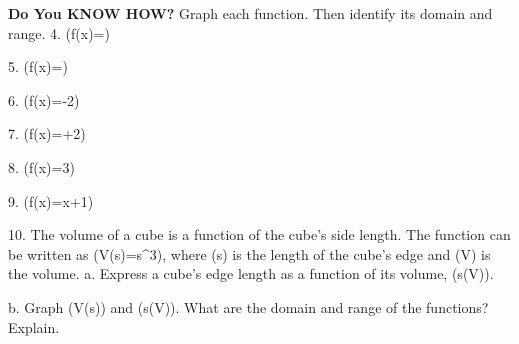 \documentclass{article}
\newenvironment{concept-summary}{}{}    %
\newcommand{\answer}[1]{}               %
\newcommand{\placeholder}[2]{}          %
\newcommand{\te}[1]{}                   %
\begin{document}
\begin{concept-summary}
\textbf{Do You KNOW HOW?}
Graph each function. Then identify its domain and range.
4. (f(x)=)
\answer{domain: (x\geq2); range: (y\geq0)}
\placeholder{graph}{Summary 4 answer: red sqrt(x-2) begins(2,0), increases with right arrow near(8,2.45). Axes x,y arrows both ends, unit grid x=-2 to 8,y=-5 to 5; x labels 2,4,6, y labels-4,-2,2,4; origin O; no dots.}
5. (f(x)=)
\answer{domain: all real numbers; range: all real numbers}
\placeholder{graph}{Summary 5 answer: red cube root(x+2), center(-2,0), arrows both ends. Axes x,y arrows both ends, unit grid[-5,5] by[-5,5], labels every 2 excluding 0, origin O; no dots.}
6. (f(x)=-2)
\answer{domain: (x\geq-1); range: (y\geq-2)}
\placeholder{graph}{Summary 6 answer: red sqrt(x+1)-2 begins(-1,-2), passes(3,0), arrow right near(7,0.83). Axes x,y arrows both ends, unit grid x=-3 to 7,y=-5 to 5; x labels-2,2,4,6; y labels-4,-2,2,4; origin O. No dots.}
7. (f(x)=+2)
\answer{domain: all real numbers; range: all real numbers}
\placeholder{graph}{Summary 7 answer: red cube root(x-3)+2, center(3,2), arrows both ends. Axes x,y arrows both ends, unit grid x=-3 to 7,y=-5 to 5; labels x-2,2,4,6, y-4,-2,2,4; origin O; no dots.}
8. (f(x)=3)
\answer{domain: (x\geq5); range: (y\geq0)}
\placeholder{graph}{Summary 8 answer: red 3sqrt(x-5), begins(5,0), arrow right near(10,6.7). Axes x,y with positive arrows, unit grid window[0,10] by[0,10], labels every 2; no point dots.}
9. (f(x)=\sqrt[3]x+1)
\answer{domain: all real numbers; range: all real numbers}
\placeholder{graph}{Summary 9 answer: red 0.5 cube root(x)+1, center(0,1), arrows both ends. Axes x,y with arrows both ends, unit grid[-5,5] by[-5,5], labels every 2 excluding 0, origin O; no dots.}
10. The volume of a cube is a function of the cube's side length. The function can be written as (V(s)=s^3), where (s) is the length of the cube's edge and (V) is the volume.
a. Express a cube's edge length as a function of its volume, (s(V)).
\answer{a. (s(V)=\sqrt[3]V)}
b. Graph (V(s)) and (s(V)). What are the domain and range of the functions? Explain.
\answer{b. The graph of (s(V)) is a reflection across the line (V=s) of (V(s)). This means the functions are inverses. The domains and ranges of both (s(V)) and (V(s)) are all real numbers.}
\placeholder{graph}{Summary 10b answer: red V(s)=s^3 and blue s(V)=cube root(V) plotted together, both through origin, arrows on all four ends. Axes horizontal s, vertical V, arrows both ends; unit grid[-5,5] by[-5,5]; labels every 2 excluding 0; origin O; curves labeled V(s) and s(V). No dots.}
\te{Printed answer and graph include negative values; the physical cube context would restrict both quantities to nonnegative values. Concept Summary, Do You Understand, and Do You Know How are available at SavvasRealize.com. Presentation; Practice.}
\end{concept-summary}
\end{document}
